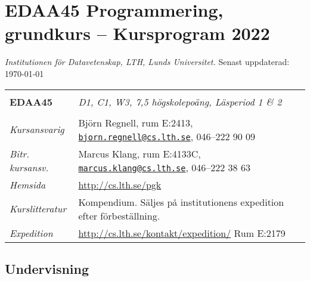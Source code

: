 \documentclass[a4paper,12pt,oneside]{memoir}
\newcommand{\YEAR}{2022}
\begin{document}


\section*{EDAA45 Programmering, grundkurs  -- Kursprogram \YEAR}
\emph{Institutionen för Datavetenskap, LTH, Lunds Universitet.} Senast uppdaterad: \today\\

\begin{longtable}[l]{ll}
\hline\\[-0.75em]%

\textbf{EDAA45} & \textit {D1, C1, W3, 7,5 högskolepoäng, Läsperiod 1 \& 2} \\[-0.75em] \tabularnewline
\hline%
\endhead
\emph{Kursansvarig}   & Björn Regnell, rum E:2413,
                        \href{mailto:bjorn.regnell@cs.lth.se}
                        {\nolinkurl{bjorn.regnell@cs.lth.se}},
                        046--222 90 09\tabularnewline
\emph{Bitr. kursansv.}   & Marcus Klang, rum E:4133C,
                        \href{mailto:marcus.klang@cs.lth.se}
                        {\nolinkurl{marcus.klang@cs.lth.se}},
                        046--222 38 63\tabularnewline
                        \emph{Hemsida}        
                        & \url{http://cs.lth.se/pgk}\tabularnewline
\emph{Kurslitteratur} & Kompendium. Säljes på institutionens expedition efter förbeställning.\tabularnewline
\emph{Expedition}     & \url{http://cs.lth.se/kontakt/expedition/} Rum E:2179
                        \tabularnewline

\hline
\end{longtable}

\subsection{Undervisning}\label{undervisning}
\end{document}
